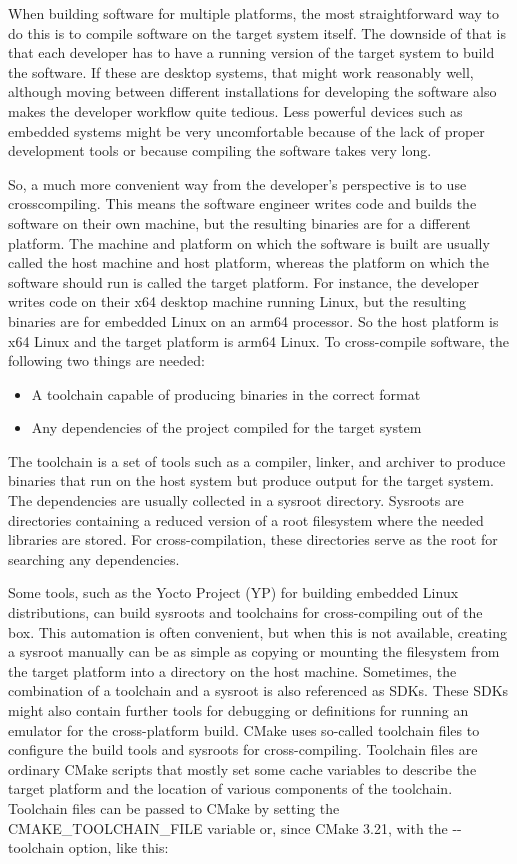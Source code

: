 When building software for multiple platforms, the most straightforward way to do this is to compile software on the target system itself. The downside of that is that each developer has to have a running version of the target system to build the software. If these are desktop systems, that might work reasonably well, although moving between different installations for developing the software also makes the developer workflow quite tedious. Less powerful devices such as embedded systems might be very uncomfortable because of the lack of proper development tools or because compiling the software takes very long.

So, a much more convenient way from the developer's perspective is to use crosscompiling. This means the software engineer writes code and builds the software on their own machine, but the resulting binaries are for a different platform. The machine and platform on which the software is built are usually called the host machine and host platform, whereas the platform on which the software should run is called the target platform. For instance, the developer writes code on their x64 desktop machine running Linux, but the resulting binaries are for embedded Linux on an arm64 processor. So the host platform is x64 Linux and the target platform is arm64 Linux. To cross-compile software, the following two things are needed:

\begin{itemize}
\item 
A toolchain capable of producing binaries in the correct format

\item 
Any dependencies of the project compiled for the target system
\end{itemize}

The toolchain is a set of tools such as a compiler, linker, and archiver to produce binaries that run on the host system but produce output for the target system. The dependencies are usually collected in a sysroot directory. Sysroots are directories containing a reduced version of a root filesystem where the needed libraries are stored. For cross-compilation, these directories serve as the root for searching any dependencies.

Some tools, such as the Yocto Project (YP) for building embedded Linux distributions, can build sysroots and toolchains for cross-compiling out of the box. This automation is often convenient, but when this is not available, creating a sysroot manually can be as simple as copying or mounting the filesystem from the target platform into a directory on the host machine. Sometimes, the combination of a toolchain and a sysroot is also referenced as SDKs. These SDKs might also contain further tools for debugging or definitions for running an emulator for the cross-platform build. CMake uses so-called toolchain files to configure the build tools and sysroots for cross-compiling. Toolchain files are ordinary CMake scripts that mostly set some cache variables to describe the target platform and the location of various components of the toolchain. Toolchain files can be passed to CMake by setting the CMAKE\_TOOLCHAIN\_FILE variable or, since CMake 3.21, with the -{}-toolchain option, like this:

